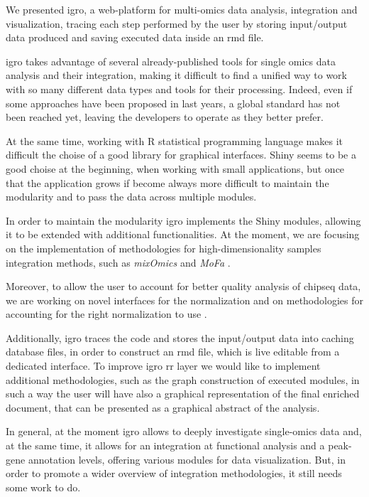 We presented \gls{igro}, a web-platform for multi-omics data analysis, integration and visualization, tracing each step performed by the user by storing input/output data produced and saving executed data inside an \gls{rmd} file.

\gls{igro} takes advantage of several already-published tools for single omics data analysis and their integration, making it difficult to find a unified way to work with so many different data types and tools for their processing.
Indeed, even if some approaches have been proposed in last years, a global standard has not been reached yet, leaving the developers to operate as they better prefer.

At the same time, working with R statistical programming language makes it difficult the choise of a good library for graphical interfaces.
Shiny seems to be a good choise at the beginning, when working with small applications, but once that the application grows if become always more difficult to maintain the modularity and to pass the data across multiple modules.

In order to maintain the modularity \gls{igro} implements the Shiny modules, allowing it to be extended with additional functionalities. At the moment, we are focusing on the implementation of methodologies for high-dimensionality samples integration methods, such as \textit{mixOmics} \cite{Rohart2017} and \textit{MoFa} \cite{Argelaguet2018}.

Moreover, to allow the user to account for better quality analysis of \gls{chipseq} data, we are working on novel interfaces for the normalization and on methodologies for accounting for the right normalization to use \cite{Angelini2015}.

Additionally, \gls{igro} traces the code and stores the input/output data into caching database files, in order to construct an \gls{rmd} file, which is live editable from a dedicated interface.
To improve \gls{igro} \gls{rr} layer we would like to implement additional methodologies, such as the graph construction of executed modules, in such a way the user will have also a graphical representation of the final enriched document, that can be presented as a graphical abstract of the analysis.

In general, at the moment \gls{igro} allows to deeply investigate single-omics data and, at the same time, it allows for an integration at functional analysis and a peak-gene annotation levels, offering various modules for data visualization.
But, in order to promote a wider overview of integration methodologies, it still needs some work to do.
